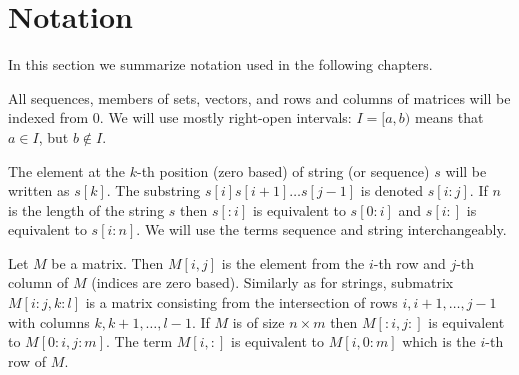\section{Notation}

In this section we summarize notation used in the following
chapters.

All sequences, members of sets, vectors, and rows and columns of matrices will
be indexed from $0$. We will use mostly right-open intervals: $I=[a,b)$ means
that $a\in I$, but $b\notin I$. 

The element at the $k$-th position (zero based) of string (or sequence) $s$ will
be written as $s[k]$. The substring $s[i]s[i+1]\dots s[j-1]$ is denoted
$s[i:j]$.  If $n$ is the length of the string $s$ then $s[:i]$ is equivalent to
$s[0:i]$ and $s[i:]$ is equivalent to $s[i:n]$.  We will use the terms sequence
and string interchangeably.

Let $M$ be a matrix. Then $M[i,j]$ is the element from the $i$-th row and $j$-th
column of $M$ (indices are zero based). Similarly as for strings, submatrix
$M[i:j,k:l]$ is a matrix consisting from the intersection of rows $i,i+1,\dots,
j-1$ with columns $k,k+1,\dots,l-1$. If $M$ is of size $n\times m$ then
$M[:i,j:]$ is equivalent to $M[0:i,j:m]$.  The term $M[i,:]$ is equivalent to
$M[i,0:m]$ which is the $i$-th row of $M$.
